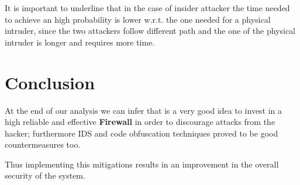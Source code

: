 \noindent It is important to underline that in the case of insider attacker the time needed to achieve an high probability is lower w.r.t. the one needed for a physical intruder, since the two attackers follow different path and the one of the physical intruder is longer and requires more time.

\section{Conclusion}
\noindent At the end of our analysis we can infer that is a very good idea to invest in a high reliable and effective \textbf{Firewall} in order to discourage attacks from the hacker; furthermore IDS and code obfuscation techniques proved to be good countermeasures too.

\noindent Thus implementing this mitigations results in an improvement in the overall security of the system.
